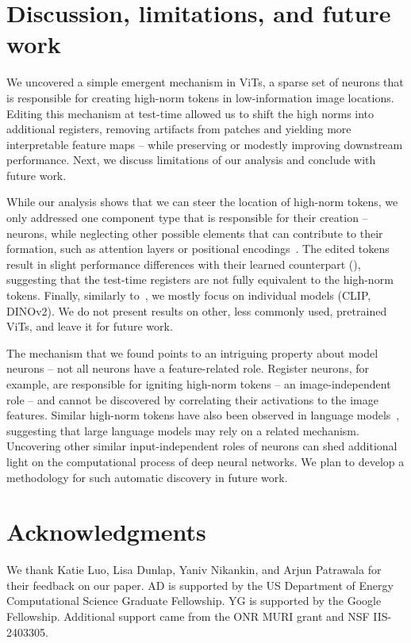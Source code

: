 \documentclass{article}
\begin{document}
\section{Discussion, limitations, and future work}
\label{sec:discussion}
We uncovered a simple emergent mechanism in ViTs, a sparse set of neurons that is responsible for creating high-norm tokens in low-information image locations. Editing this mechanism at test-time allowed us to shift the high norms into additional registers, removing artifacts from patches and yielding more interpretable feature maps -- while preserving or modestly improving downstream performance. Next, we discuss limitations of our analysis and conclude with future work.

While our analysis shows that we can steer the location of high-norm tokens, we only addressed one component type that is responsible for their creation -- neurons, while neglecting other possible elements that can contribute to their formation, such as attention layers or positional encodings~\citep{yang2024denoising}. The edited tokens result in slight performance differences with their learned counterpart (), suggesting that the test-time registers are not fully equivalent to the high-norm tokens. Finally, similarly to~\cite{darcet2024vision}, we mostly focus on individual models (CLIP, DINOv2). We do not present results on other, less commonly used, pretrained ViTs, and leave it for future work.

The mechanism that we found points to an intriguing property about model neurons -- not all neurons have a feature-related role. Register neurons, for example, are responsible for igniting high-norm tokens -- an image-independent role -- and cannot be discovered by correlating their activations to the image features. Similar high-norm tokens have also been observed in language models~\citep{xiaoefficient, dettmers2022gpt3}, suggesting that large language models may rely on a related mechanism. Uncovering other similar input-independent roles of neurons can shed additional light on the computational process of deep neural networks. We plan to develop a methodology for such automatic discovery in future work. 

\section{Acknowledgments}
\label{sec:awknowledgements}

We thank Katie Luo, Lisa Dunlap, Yaniv Nikankin, and Arjun Patrawala for their feedback on our paper. AD is supported by the US Department of Energy Computational Science Graduate Fellowship. YG is supported by the Google Fellowship. Additional support came from the ONR MURI grant and NSF IIS-2403305.
\end{document}
